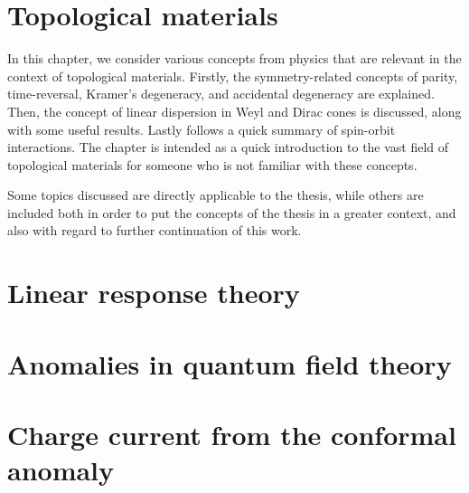\documentclass[
draft,
fontsize=11pt,
paper=B5,
BCOR=5mm,
captions=tableheading,
]{scrbook}
\begin{document}
% 
\frontmatter
{}


\tableofcontents

\mainmatter
{}


\chapter{Topological materials}
In this chapter, we consider various concepts from physics that are relevant in the context of topological materials.
Firstly, the symmetry-related concepts of parity, time-reversal, Kramer's degeneracy, and accidental degeneracy are explained.
Then, the concept of linear dispersion in Weyl and Dirac cones is discussed, along with some useful results.
Lastly follows a quick summary of spin-orbit interactions.
The chapter is intended as a quick introduction to the vast field of topological materials for someone who is not familiar with these concepts.

Some topics discussed are directly applicable to the thesis, while others are included both in order to put the concepts of the thesis in a greater context, and also with regard to further continuation of this work.








\chapter{Linear response theory}


\chapter{Anomalies in quantum field theory}


\chapter{Charge current from the conformal anomaly}\label{ch:charge-current}





\end{document}
